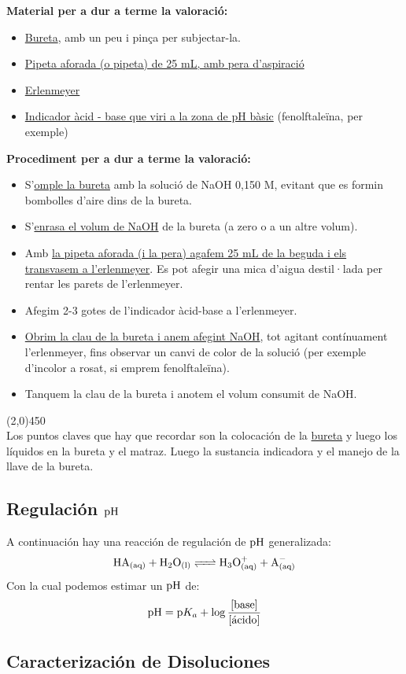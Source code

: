 \documentclass[arial,a4paper,print]{article}
\begin{document}
\textbf{Material per a dur a terme la valoració:}
\begin{itemize}
	\item \underline{Bureta}, amb un peu i pinça per subjectar-la.
	\item \underline{Pipeta aforada (o pipeta) de 25 mL, amb pera d’aspiració}
	\item \underline{Erlenmeyer}
	\item \underline{Indicador àcid - base que viri a la zona de pH bàsic} (fenolftaleïna, per exemple)
\end{itemize}
\textbf{Procediment per a dur a terme la valoració:}
\begin{itemize}
	\item S’\underline{omple la bureta} amb la solució de NaOH 0,150 M, evitant que es formin
bombolles d’aire dins de la bureta.
	\item S’\underline{enrasa el volum de NaOH} de la bureta (a zero o a un altre volum).
	\item Amb \underline{la pipeta aforada (i la pera) agafem 25 mL de la beguda i els transvasem a
l’erlenmeyer}. Es pot afegir una mica d’aigua destil·lada per rentar les parets
de l’erlenmeyer.
	\item Afegim 2-3 gotes de l’indicador àcid-base a l’erlenmeyer.
	\item \underline{Obrim la clau de la bureta i anem afegint NaOH}, tot agitant contínuament
l’erlenmeyer, fins observar un canvi de color de la solució (per exemple
d’incolor a rosat, si emprem fenolftaleïna).
	\item Tanquem la clau de la bureta i anotem el volum consumit de NaOH. 
\end{itemize}
\line(2,0){450}
\\
Los puntos claves que hay que recordar son la colocación de la \underline{bureta} y luego los líquidos en la bureta y el matraz. Luego la sustancia indicadora y el manejo de la llave de la bureta. 

\subsection{Regulación $\ce{pH}$}
A continuación hay una reacción de regulación de $\ce{pH}$ generalizada:
\begin{equation*}
	\ce{HA_{(aq)} + H2O_{(l)} <=> H3O^+_{(aq)} + A^-_{(aq)}}
\end{equation*}
Con la cual podemos estimar un $\ce{pH}$ de:
\begin{equation*}
	\ce{pH} = \ce{p}K_{a} + \log\frac{[\text{base}]}{[\text{ácido}]}
\end{equation*}

\subsection{Caracterización de Disoluciones}
\end{document}
